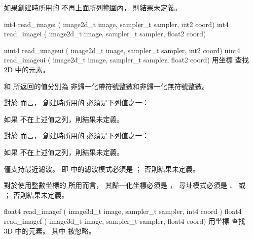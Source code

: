 如果創建時所用的  不再上面所列範圍內，
則結果未定義。
\stopbuffer

int4 read_imagei (
	image2d_t image,
	sampler_t sampler,
	int2 coord)
int4 read_imagei (
	image2d_t image,
	sampler_t sampler,
	float2 coord)

uint4 read_imageui (
	image2d_t image,
	sampler_t sampler,
	int2 coord)
uint4 read_imageui (
	image2d_t image,
	sampler_t sampler,
	float2 coord)
\stopbuffer
{}
用坐標  查找 2D   中的元素。

 和  所返回的值分別為
非歸一化帶符號整數和非歸一化無符號整數。

對於  而言，
創建時所用的  必須是下列值之一：
\startigBase[indentnext=no]
\item {}
\item {}
\item {}
\stopigBase
如果  不在上述值之列，則結果未定義。

對於  而言，
創建時所用的  必須是下列值之一：
\startigBase[indentnext=no]
\item {}
\item {}
\item {}
\stopigBase
如果  不在上述值之列，則結果未定義。

 僅支持最近濾波。
即  中的濾波模式必須是 ；
否則結果未定義。

對於使用整數坐標的  所用而言，
其歸一化坐標必須是 ，
尋址模式必須是 、 
 或 ；
否則結果未定義。
\stopbuffer

float4 read_imagef (
	image3d_t image,
	sampler_t sampler,
	int4 coord )
float4 read_imagef (
	image3d_t image,
	sampler_t sampler,
	float4 coord)
\stopbuffer
{}
用坐標 
 查找 3D   中的元素。
其中  被忽略。

